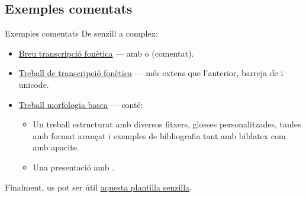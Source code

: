\subsection{Exemples comentats}\label{sec:exemples_comentats}
\begin{frame}{Exemples comentats}
De senzill a complex:
\begin{itemize}
    \item \href{https://www.overleaf.com/read/rgxbsfvqsgbw\#ba04b9}{Breu transcripció fonètica} --- amb  o  (comentat).
    \item \href{https://www.overleaf.com/read/mxysfjcnnppm\#294a25}{Treball de transcripció fonètica} --- més extens que l'anterior, barreja de  i unicode.
    \item \href{https://www.overleaf.com/read/sxkcdfrpmbcb\#10abd3}{Treball morfologia basca} --- conté:
\begin{itemize}
    \item Un treball estructurat amb diversos fitxers, glosses personalitzades, taules amb format avançat i exemples de bibliografia tant amb biblatex com amb apacite.
    \item Una presentació amb .
\end{itemize}
\end{itemize}

Finalment, us pot ser útil \href{https://www.overleaf.com/read/zkfhtdnpbdwq\#2f636f}{aquesta plantilla senzilla}.

\end{frame}

